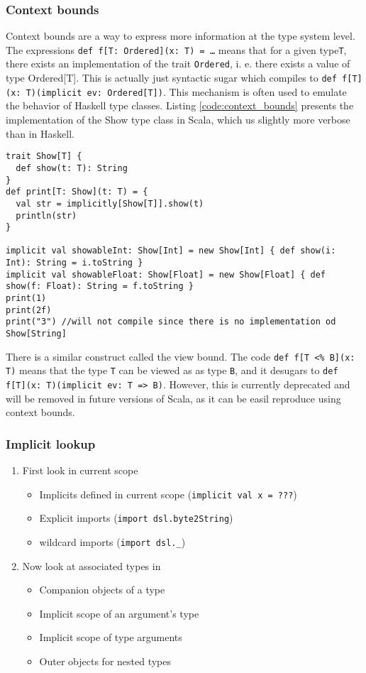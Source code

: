\subsubsection{Context bounds}
Context bounds are a way to express more information at the type system level. The expressions \texttt{def f[T: Ordered](x: T) = \ldots} means that for a given type\texttt{T}, there exists an implementation of the trait \texttt{Ordered}, i. e. there exists a value of type Ordered[T]. This is actually just syntactic sugar which compiles to \texttt{def f[T](x: T)(implicit ev: Ordered[T])}. This mechanism is often used to emulate the behavior of Haskell type classes. Listing \ref{code:context_bounds} presents the implementation of the Show type class in Scala, which us slightly more verbose than in Haskell.

\begin{lstlisting}[caption=Context bounds, label=code:context_bounds, float]
trait Show[T] {
  def show(t: T): String
}
def print[T: Show](t: T) = {
  val str = implicitly[Show[T]].show(t)
  println(str)
}

implicit val showableInt: Show[Int] = new Show[Int] { def show(i: Int): String = i.toString }
implicit val showableFloat: Show[Float] = new Show[Float] { def show(f: Float): String = f.toString }
print(1)
print(2f)
print("3") //will not compile since there is no implementation od Show[String]
\end{lstlisting}

There is a similar construct called the view bound. The code \texttt{def f[T <\% B](x: T)} means that the type \texttt{T} can be viewed as as type \texttt{B}, and it desugars to \texttt{def f[T](x: T)(implicit ev: T => B)}. However, this is currently deprecated and will be removed in future versions of Scala, as it can be easil reproduce using context bounds.

\subsubsection{Implicit lookup}
\begin{enumerate}
	\item First look in current scope
	\begin{itemize}
		\item Implicits defined in current scope (\texttt{implicit val x = ???})
    \item Explicit imports (\texttt{import dsl.byte2String})
    \item wildcard imports (\texttt{import dsl.\_})
	\end{itemize}
	\item Now look at associated types in
	\begin{itemize}
		\item Companion objects of a type
		\item Implicit scope of an argument’s type
		\item Implicit scope of type arguments
		\item Outer objects for nested types
	\end{itemize}
\end{enumerate}

